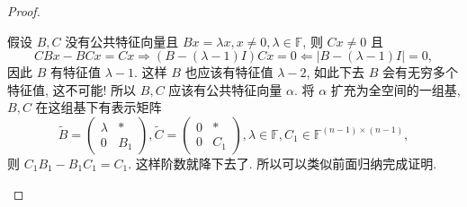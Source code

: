 \documentclass[../../main.tex]{subfiles}%
\begin{document}
\begin{proof}
\begin{enumerate}[(1)]
假设 \( B, C \) 没有公共特征向量且 \( Bx = \lambda x, x \neq 0, \lambda \in \mathbb{F} \), 则 \( Cx \neq 0 \) 且
\[
CBx - BCx = Cx \Longrightarrow (B - (\lambda - 1)I)Cx = 0\Longleftarrow |B-(\lambda-1)I|=0,
\]
因此 \( B \) 有特征值 \( \lambda - 1 \). 这样 \( B \) 也应该有特征值 \( \lambda - 2 \), 如此下去 \( B \) 会有无穷多个特征值, 这不可能! 所以 \( B, C \) 应该有公共特征向量 \( \alpha \). 将 \( \alpha \) 扩充为全空间的一组基, \( B, C \) 在这组基下有表示矩阵
\[
\widetilde{B} = \begin{pmatrix} \lambda & * \\ 0 & B_1 \end{pmatrix}, \widetilde{C} = \begin{pmatrix} 0 & * \\ 0 & C_1 \end{pmatrix}, \lambda \in \mathbb{F}, C_1 \in \mathbb{F}^{(n - 1) \times (n - 1)},
\]
则 \( C_1B_1 - B_1C_1 = C_1 \). 这样阶数就降下去了. 所以可以类似前面归纳完成证明.
\end{enumerate}
\end{proof}
\end{document}
